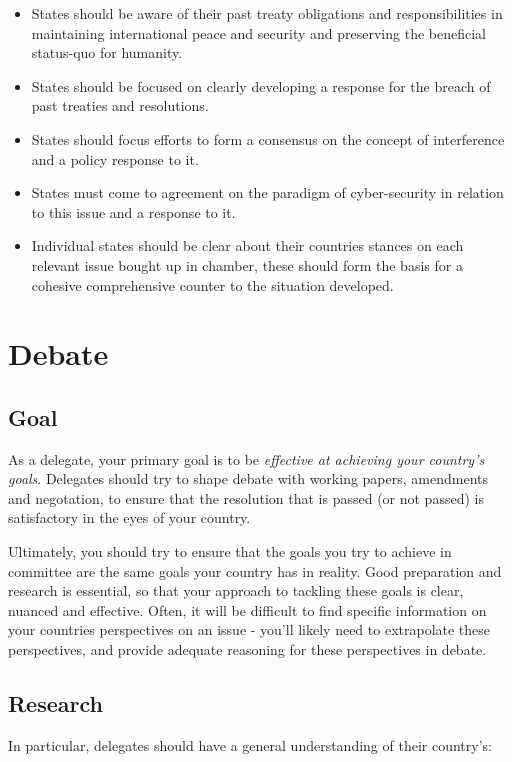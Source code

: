 \documentclass[11pt,a4paper]{report}
\begin{document}
\begin{itemize}
	\item States should be aware of their past treaty obligations and responsibilities in maintaining international peace and security and preserving the beneficial status-quo for humanity.
	\item States should be focused on clearly developing a response for the breach of past treaties and resolutions.
	\item States should focus efforts to form a consensus on the concept of interference and a policy response to it.
	\item States must come to agreement on the paradigm of cyber-security in relation to this issue and a response to it.
	\item Individual states should be clear about their countries stances on each relevant issue bought up in chamber, these should form the basis for a cohesive comprehensive counter to the situation developed.
\end{itemize}


\chapter{Debate}

\section{Goal}

As a delegate, your primary goal is to be \textit{effective at achieving your country's goals}. Delegates should try to shape debate with working papers, amendments and negotation, to ensure that the resolution that is passed (or not passed) is satisfactory in the eyes of your country.

Ultimately, you should try to ensure that the goals you try to achieve in committee are the same goals your country has in reality. Good preparation and research is essential, so that your approach to tackling these goals is clear, nuanced and effective. Often, it will be difficult to find specific information on your countries perspectives on an issue - you'll likely need to extrapolate these perspectives, and provide adequate reasoning for these perspectives in debate. 

\section{Research}

In particular, delegates should have a general understanding of their country's:
\end{document}
